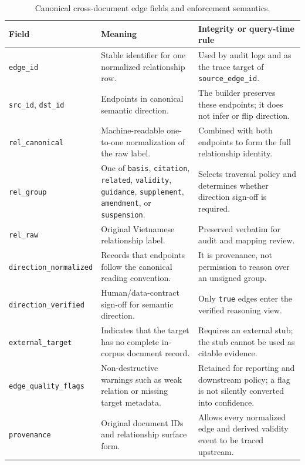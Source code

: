 \begin{table}[t]
\centering
\scriptsize
\caption{Canonical cross-document edge fields and enforcement semantics.}
\label{tab:appendix-edge-fields}
\begin{tabular}{p{}p{}p{}}
\toprule
\textbf{Field} & \textbf{Meaning} & \textbf{Integrity or query-time rule} \\
\midrule
\texttt{edge\_id} & Stable identifier for one normalized relationship row. & Used by audit logs and as the trace target of \texttt{source\_edge\_id}. \\
\texttt{src\_id}, \texttt{dst\_id} & Endpoints in canonical semantic direction. & The builder preserves these endpoints; it does not infer or flip direction. \\
\texttt{rel\_canonical} & Machine-readable one-to-one normalization of the raw label. & Combined with both endpoints to form the full relationship identity. \\
\texttt{rel\_group} & One of \texttt{basis}, \texttt{citation}, \texttt{related}, \texttt{validity}, \texttt{guidance}, \texttt{supplement}, \texttt{amendment}, or \texttt{suspension}. & Selects traversal policy and determines whether direction sign-off is required. \\
\texttt{rel\_raw} & Original Vietnamese relationship label. & Preserved verbatim for audit and mapping review. \\
\texttt{direction\_normalized} & Records that endpoints follow the canonical reading convention. & It is provenance, not permission to reason over an unsigned group. \\
\texttt{direction\_verified} & Human/data-contract sign-off for semantic direction. & Only \texttt{true} edges enter the verified reasoning view. \\
\texttt{external\_target} & Indicates that the target has no complete in-corpus document record. & Requires an external stub; the stub cannot be used as citable evidence. \\
\texttt{edge\_quality\_flags} & Non-destructive warnings such as weak relation or missing target metadata. & Retained for reporting and downstream policy; a flag is not silently converted into confidence. \\
\texttt{provenance} & Original document IDs and relationship surface form. & Allows every normalized edge and derived validity event to be traced upstream. \\
\bottomrule
\end{tabular}
\end{table}

